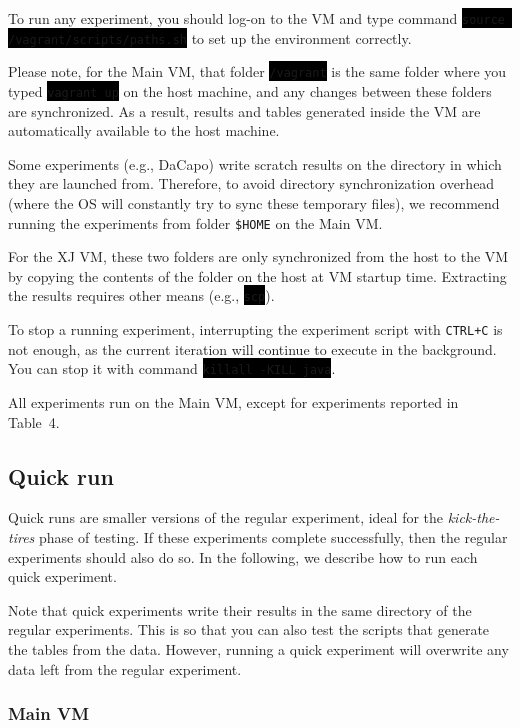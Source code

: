 \documentclass[12pt]{article}
\newcommand{\command}[1]{\colorbox{black}{\texttt{\color{white}#1}}}
\newcommand{\vm}[1]{\colorbox{green!20}{\texttt{\color{black}#1}}}
\begin{document}
To run any experiment, you should log-on to the VM and type command
\command{source /vagrant/scripts/paths.sh} to set up the environment correctly.

Please note, for the Main VM, that folder \command{/vagrant} is the same folder
where you typed \command{vagrant up} on the host machine, and any changes between
these folders are synchronized.  As a result, results and tables generated
inside the VM are automatically available to the host machine.

Some experiments (e.g., DaCapo) write scratch results on the directory in which
they are launched from.  Therefore, to avoid directory synchronization overhead (where the OS will constantly try to sync these temporary files),
we recommend running the experiments from folder \vm{\$HOME} on the
Main VM.

For the XJ VM, these two folders are only synchronized from the host to the VM
by copying the contents of the folder on the host at VM startup time.
Extracting the results requires other means (e.g., \command{scp}).

To stop a running experiment, interrupting the experiment script with
\texttt{CTRL+C} is not enough, as the current iteration will continue to execute
in the background.  You can stop it with command \command{killall -KILL java}.

All experiments run on the Main VM, except for experiments reported in Table~4.

\subsection{Quick run}
\label{sec:quickrun}

Quick runs are smaller versions of the regular experiment, ideal for the
\emph{kick-the-tires} phase of testing.  If these experiments complete
successfully, then the regular experiments should also do so.  In the following,
we describe how to run each quick experiment.

Note that quick experiments write their results in the same directory of the
regular experiments.  This is so that you can also test the scripts that
generate the tables from the data.  However, running a quick experiment will
overwrite any data left from the regular experiment.

\subsubsection{Main VM}
\end{document}
